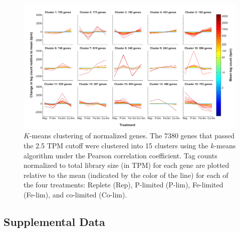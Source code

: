 \begin{landscape}
   \null         %
   \vfill        %
   \centering 
    \begin{figure}
    \centering
        \includegraphics[width=1\textwidth]{Images/C2_FigureS2_v6.pdf}
        \caption[$K$-means clustering of normalized genes]{$K$-means clustering of normalized genes. The 7380 genes that passed the 2.5 TPM cutoff were clustered into 15 clusters using the $k$-means algorithm under the Pearson correlation coefficient. Tag counts normalized to total library size (in TPM) for each gene are plotted relative to the mean (indicated by the color of the line) for each of the four treatments: Replete (Rep), P-limited (P-lim), Fe-limited (Fe-lim), and co-limited (Co-lim).}
    \label{fig:a1f2} 
    \end{figure}
    \vfill        %
\end{landscape}

\clearpage
\subsection{Supplemental Data}


